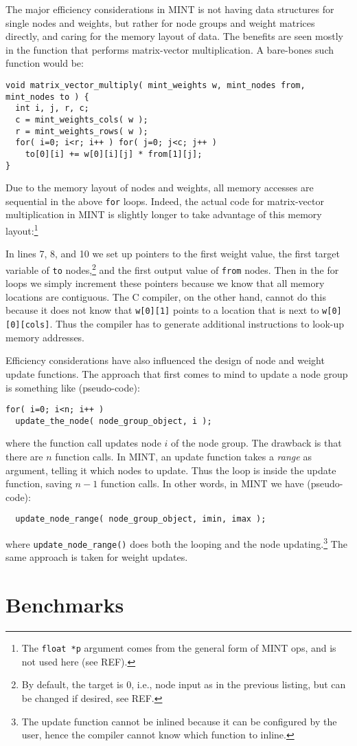 \documentclass[12pt,letterpaper]{memoir}
\newcommand{\mint}{MINT\xspace}
\begin{document}
The major efficiency considerations in \mint is not having data
structures for single nodes and weights, but rather for node groups
and weight matrices directly, and caring for the memory layout of
data. The benefits are seen mostly in the function that performs
matrix-vector multiplication. A bare-bones such function would be:
\begin{lstlisting}
void matrix_vector_multiply( mint_weights w, mint_nodes from, mint_nodes to ) {
  int i, j, r, c;
  c = mint_weights_cols( w );
  r = mint_weights_rows( w );
  for( i=0; i<r; i++ ) for( j=0; j<c; j++ ) 
    to[0][i] += w[0][i][j] * from[1][j];
}  
\end{lstlisting}
Due to the memory layout of nodes and weights, all memory accesses are
sequential in the above \lstinline{for} loops. Indeed, the actual code
for matrix-vector multiplication in \mint is slightly longer to take
advantage of this memory layout:\footnote{The \lstinline{float *p}
  argument comes from the general form of \mint ops, and is not used
  here (see REF).}



In lines 7, 8, and 10 we set up pointers to the first weight value,
the first target variable of \lstinline{to} nodes,\footnote{By
  default, the target is 0, i.e., node input as in the previous
  listing, but can be changed if desired, see REF.} and the first
output value of \lstinline{from} nodes. Then in the for loops we
simply increment these pointers because we know that all memory
locations are contiguous. The C compiler, on the other hand, cannot do
this because it does not know that \lstinline{w[0][1]} points to a
location that is next to \lstinline{w[0][0][cols]}. Thus the compiler
has to generate additional instructions to look-up memory addresses.

Efficiency considerations have also influenced the design of node and
weight update functions. The approach that first comes to mind to
update a node group is something like (pseudo-code):
\begin{lstlisting}
for( i=0; i<n; i++ )
  update_the_node( node_group_object, i );
\end{lstlisting}
where the function call updates node $i$ of the node group. The
drawback is that there are $n$ function calls. In \mint, an update
function takes a \textit{range} as argument, telling it which nodes to
update. Thus the loop is inside the update function, saving $n-1$
function calls. In other words, in \mint we have 
(pseudo-code):
\begin{lstlisting}
  update_node_range( node_group_object, imin, imax );
\end{lstlisting}
where \lstinline{update_node_range()} does both the looping and the
node updating.\footnote{The update function cannot be inlined because
  it can be configured by the user, hence the compiler cannot know
  which function to inline.} The same approach is taken for weight
updates.

\section{Benchmarks}

\clearpage

\printindex
\end{document}
